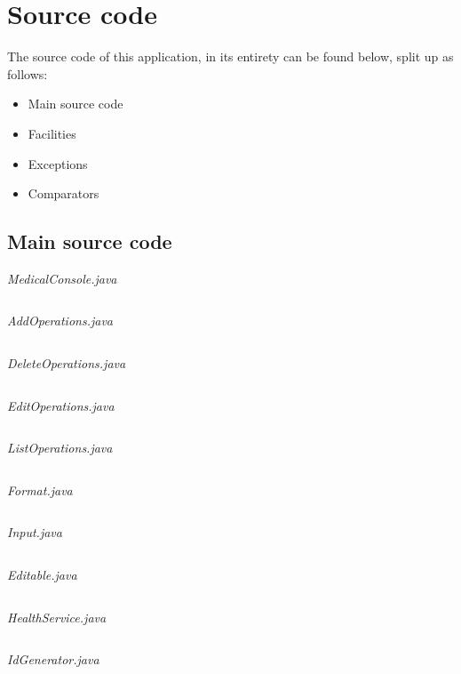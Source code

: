 \documentclass{article}
\begin{document}
	\section{Source code}\label{sec:code} %
	The source code of this application, in its entirety can be found below, split up as follows: 
	\begin{itemize}
		\item Main source code 
		\item Facilities
		\item Exceptions
		\item Comparators
	\end{itemize}

	\subsection{Main source code}\label{sub:main_source_code} %
	\textit{MedicalConsole.java}
	\inputminted{java}{src/main/java/com/yvesstraten/medicalconsole/MedicalConsole.java}

	\textit{AddOperations.java}
	\inputminted{java}{./src/main/java/com/yvesstraten/medicalconsole/operations/AddOperations.java}

	\textit{DeleteOperations.java}
	\inputminted{java}{./src/main/java/com/yvesstraten/medicalconsole/operations/DeleteOperations.java}

	\textit{EditOperations.java}
	\inputminted{java}{./src/main/java/com/yvesstraten/medicalconsole/operations/EditOperations.java}

	\textit{ListOperations.java}
	\inputminted{java}{./src/main/java/com/yvesstraten/medicalconsole/operations/ListOperations.java}

	\textit{Format.java}
	\inputminted{java}{src/main/java/com/yvesstraten/medicalconsole/Format.java}

	\textit{Input.java}
	\inputminted{java}{src/main/java/com/yvesstraten/medicalconsole/Input.java}

	\newpage 

	\textit{Editable.java}\label{Editable}
	\inputminted{java}{src/main/java/com/yvesstraten/medicalconsole/Editable.java}

	\textit{HealthService.java}
	\inputminted{java}{src/main/java/com/yvesstraten/medicalconsole/HealthService.java}

	\textit{IdGenerator.java}
	\inputminted{java}{src/main/java/com/yvesstraten/medicalconsole/IdGenerator.java}
\end{document}
